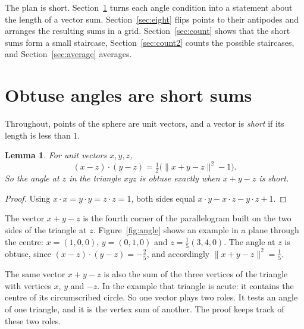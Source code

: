 \documentclass[11pt,a4paper]{article}
\newtheorem{lemma}{Lemma}
\begin{document}
The plan is short. Section~\ref{sec:angle} turns each angle condition into
a statement about the length of a vector sum. Section~\ref{sec:eight}
flips points to their antipodes and arranges the resulting sums in a grid.
Section~\ref{sec:count} shows that the short sums form a small staircase,
Section~\ref{sec:count2} counts the possible staircases, and
Section~\ref{sec:average} averages.

\section{Obtuse angles are short sums}\label{sec:angle}

Throughout, points of the sphere are unit vectors, and a vector is
\emph{short} if its length is less than $1$.

\begin{lemma}\label{lem:angle}
For unit vectors $x,y,z$,
\[
 (x-z)\cdot(y-z)=\tfrac12\bigl(\|x+y-z\|^2-1\bigr).
\]
So the angle at $z$ in the triangle $xyz$ is obtuse exactly when $x+y-z$ is
short.
\end{lemma}

\begin{proof}
Using $x\cdot x=y\cdot y=z\cdot z=1$, both sides equal
$x\cdot y-x\cdot z-y\cdot z+1$.
\end{proof}

The vector $x+y-z$ is the fourth corner of the parallelogram built on the
two sides of the triangle at $z$. Figure~\ref{fig:angle} shows an example
in a plane through the centre: $x=(1,0,0)$, $y=(0,1,0)$ and
$z=\frac15(3,4,0)$. The angle at $z$ is obtuse, since
$(x-z)\cdot(y-z)=-\frac25$, and accordingly $\|x+y-z\|^2=\frac15$.

The same vector $x+y-z$ is also the sum of the three vertices of the
triangle with vertices $x$, $y$ and $-z$. In the example that triangle is
acute: it contains the centre of its circumscribed circle. So one vector
plays two roles. It tests an angle of one triangle, and it is the vertex
sum of another. The proof keeps track of these two roles.
\end{document}
